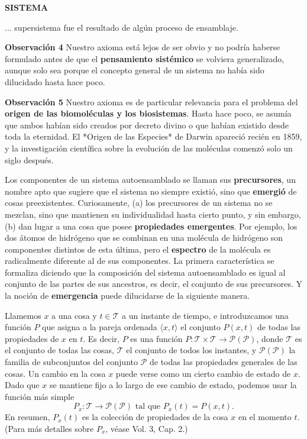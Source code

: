 \newpage
\fancyhf{}
\fancyhead[r]{\thepage}
\begin{center}
{\fontsize{16}{18}\selectfont \textbf{SISTEMA}}
\end{center}
\vspace{0.5cm}

{\fontsize{13}{15}\selectfont
... supersistema fue el resultado de algún proceso de ensamblaje.

\textbf{Observación 4} Nuestro axioma está lejos de ser obvio y no podría haberse formulado antes de que el \textbf{pensamiento sistémico} se volviera generalizado, aunque solo sea porque el concepto general de un sistema no había sido dilucidado hasta hace poco.

\textbf{Observación 5} Nuestro axioma es de particular relevancia para el problema del \textbf{origen de las biomoléculas y los biosistemas}. Hasta hace poco, se asumía que ambos habían sido creados por decreto divino o que habían existido desde toda la eternidad. El *Origen de las Especies* de Darwin apareció recién en 1859, y la investigación científica sobre la evolución de las moléculas comenzó solo un siglo después.

Los componentes de un sistema autoensamblado se llaman sus \textbf{precursores}, un nombre apto que sugiere que el sistema no siempre existió, sino que \textbf{emergió} de cosas preexistentes. Curiosamente, (a) los precursores de un sistema no se mezclan, sino que mantienen su individualidad hasta cierto punto, y sin embargo, (b) dan lugar a una cosa que posee \textbf{propiedades emergentes}. Por ejemplo, los dos átomos de hidrógeno que se combinan en una molécula de hidrógeno son componentes distintos de esta última, pero el \textbf{espectro} de la molécula es radicalmente diferente al de sus componentes. La primera característica se formaliza diciendo que la composición del sistema autoensamblado es igual al conjunto de las partes de sus ancestros, es decir, el conjunto de sus precursores. Y la noción de \textbf{emergencia} puede dilucidarse de la siguiente manera.

Llamemos $x$ a una cosa y $t \in \mathcal{T}$ a un instante de tiempo, e introduzcamos una función $P$ que asigna a la pareja ordenada $\langle x, t \rangle$ el conjunto $P(x, t)$ de todas las propiedades de $x$ en $t$. Es decir, $P$ es una función $P: \mathcal{T} \times \mathcal{T} \rightarrow \mathcal{P}(\mathcal{P})$, donde $\mathcal{T}$ es el conjunto de todas las cosas, $\mathcal{T}$ el conjunto de todos los instantes, y $\mathcal{P}(\mathcal{P})$ la familia de subconjuntos del conjunto $\mathcal{P}$ de todas las propiedades generales de las cosas. Un cambio en la cosa $x$ puede verse como un cierto cambio de estado de $x$. Dado que $x$ se mantiene fijo a lo largo de ese cambio de estado, podemos usar la función más simple
$$ P_x: \mathcal{T} \longrightarrow \mathcal{P}(\mathcal{P}) \text{ tal que } P_x(t) = P(x, t). $$
En resumen, $P_x(t)$ es la colección de propiedades de la cosa $x$ en el momento $t$. (Para más detalles sobre $P_x$, véase Vol. 3, Cap. 2.)

}
